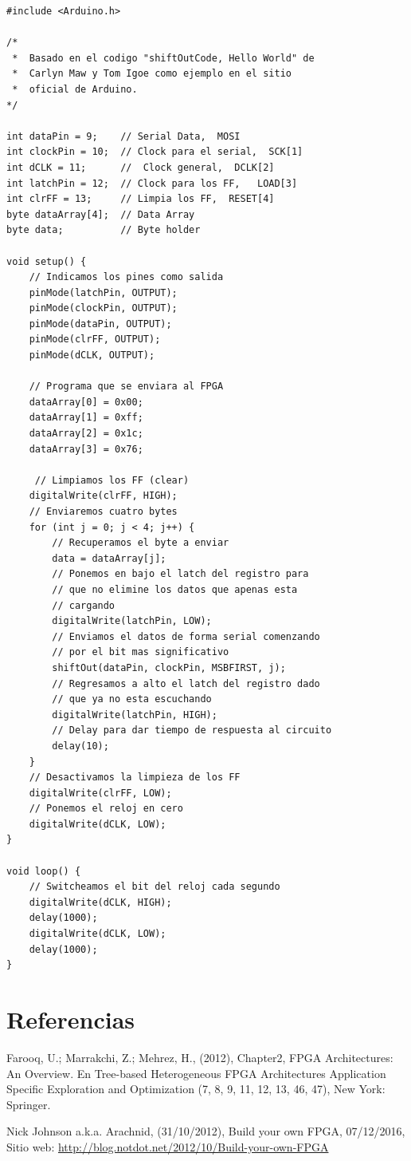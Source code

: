 \documentclass[12pt]{article}
\begin{document}
\begin{lstlisting}
#include <Arduino.h>

/* 
 *  Basado en el codigo "shiftOutCode, Hello World" de 
 *  Carlyn Maw y Tom Igoe como ejemplo en el sitio 
 *  oficial de Arduino.
*/

int dataPin = 9;    // Serial Data,  MOSI
int clockPin = 10;  // Clock para el serial,  SCK[1]
int dCLK = 11;      //  Clock general,  DCLK[2]
int latchPin = 12;  // Clock para los FF,   LOAD[3]
int clrFF = 13;     // Limpia los FF,  RESET[4]
byte dataArray[4];  // Data Array
byte data;          // Byte holder

void setup() {
    // Indicamos los pines como salida
    pinMode(latchPin, OUTPUT);
    pinMode(clockPin, OUTPUT);
    pinMode(dataPin, OUTPUT);
    pinMode(clrFF, OUTPUT);
    pinMode(dCLK, OUTPUT);

    // Programa que se enviara al FPGA
    dataArray[0] = 0x00;
    dataArray[1] = 0xff;
    dataArray[2] = 0x1c;
    dataArray[3] = 0x76;

     // Limpiamos los FF (clear)
    digitalWrite(clrFF, HIGH);
    // Enviaremos cuatro bytes
    for (int j = 0; j < 4; j++) {
        // Recuperamos el byte a enviar
        data = dataArray[j];
        // Ponemos en bajo el latch del registro para 
        // que no elimine los datos que apenas esta 
        // cargando
        digitalWrite(latchPin, LOW);
        // Enviamos el datos de forma serial comenzando
        // por el bit mas significativo
        shiftOut(dataPin, clockPin, MSBFIRST, j);
        // Regresamos a alto el latch del registro dado 
        // que ya no esta escuchando
        digitalWrite(latchPin, HIGH);
        // Delay para dar tiempo de respuesta al circuito
        delay(10);
    }
    // Desactivamos la limpieza de los FF
    digitalWrite(clrFF, LOW);
    // Ponemos el reloj en cero
    digitalWrite(dCLK, LOW);
}

void loop() {
    // Switcheamos el bit del reloj cada segundo
    digitalWrite(dCLK, HIGH);
    delay(1000);
    digitalWrite(dCLK, LOW);
    delay(1000);
}
\end{lstlisting}

\section{Referencias}
\begin{thebibliography}{}

  Farooq, U.; Marrakchi, Z.; Mehrez, H.,
  (2012),
  Chapter2, FPGA Architectures: An Overview. En Tree-based Heterogeneous FPGA Architectures Application Specific Exploration and Optimization (7, 8, 9, 11, 12, 13, 46, 47),
  New York: Springer.

  Nick Johnson a.k.a. Arachnid,
  (31/10/2012),
  Build your own FPGA,
  07/12/2016,
  Sitio web: \url{http://blog.notdot.net/2012/10/Build-your-own-FPGA}

\end{thebibliography}



\end{document}
